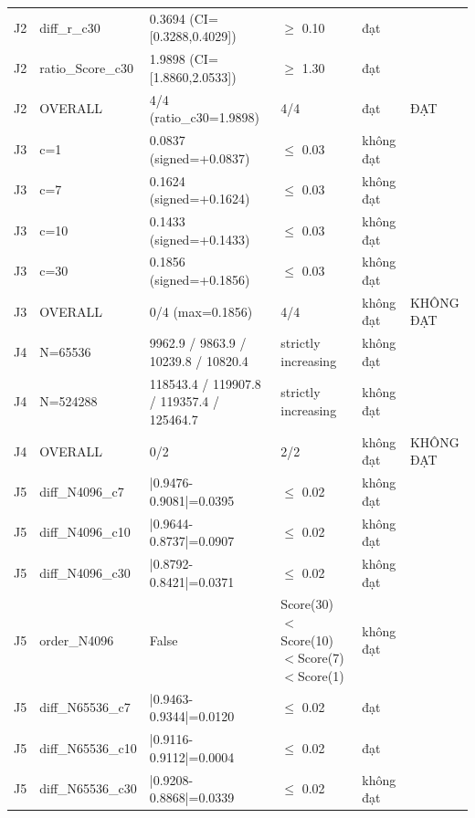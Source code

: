 \begin{longtable}{p{0.8cm}p{2.2cm}p{3.9cm}p{3.2cm}p{1.1cm}p{2.4cm}}
J2 & diff\_\allowbreak{}r\_\allowbreak{}c30 & 0.3694 (CI=\allowbreak{}[0.3288,\allowbreak{}0.4029]) & $\ge$\allowbreak{} 0.10 & đạt &  \\
J2 & ratio\_\allowbreak{}Score\_\allowbreak{}c30 & 1.9898 (CI=\allowbreak{}[1.8860,\allowbreak{}2.0533]) & $\ge$\allowbreak{} 1.30 & đạt &  \\
J2 & OVERALL & 4/4 (ratio\_\allowbreak{}c30=\allowbreak{}1.9898) & 4/4 & đạt & ĐẠT \\
J3 & c=\allowbreak{}1 & 0.0837 (signed=\allowbreak{}+0.0837) & $\le$\allowbreak{} 0.03 & không đạt &  \\
J3 & c=\allowbreak{}7 & 0.1624 (signed=\allowbreak{}+0.1624) & $\le$\allowbreak{} 0.03 & không đạt &  \\
J3 & c=\allowbreak{}10 & 0.1433 (signed=\allowbreak{}+0.1433) & $\le$\allowbreak{} 0.03 & không đạt &  \\
J3 & c=\allowbreak{}30 & 0.1856 (signed=\allowbreak{}+0.1856) & $\le$\allowbreak{} 0.03 & không đạt &  \\
J3 & OVERALL & 0/4 (max=\allowbreak{}0.1856) & 4/4 & không đạt & KHÔNG ĐẠT \\
J4 & N=\allowbreak{}65536 & 9962.9 / 9863.9 / 10239.8 / 10820.4 & strictly increasing & không đạt &  \\
J4 & N=\allowbreak{}524288 & 118543.4 / 119907.8 / 119357.4 / 125464.7 & strictly increasing & không đạt &  \\
J4 & OVERALL & 0/2 & 2/2 & không đạt & KHÔNG ĐẠT \\
J5 & diff\_\allowbreak{}N4096\_\allowbreak{}c7 & |0.9476-0.9081|=\allowbreak{}0.0395 & $\le$\allowbreak{} 0.02 & không đạt &  \\
J5 & diff\_\allowbreak{}N4096\_\allowbreak{}c10 & |0.9644-0.8737|=\allowbreak{}0.0907 & $\le$\allowbreak{} 0.02 & không đạt &  \\
J5 & diff\_\allowbreak{}N4096\_\allowbreak{}c30 & |0.8792-0.8421|=\allowbreak{}0.0371 & $\le$\allowbreak{} 0.02 & không đạt &  \\
J5 & order\_\allowbreak{}N4096 & False & Score(30)$<$\allowbreak{}Score(10)$<$\allowbreak{}Score(7)$<$\allowbreak{}Score(1) & không đạt &  \\
J5 & diff\_\allowbreak{}N65536\_\allowbreak{}c7 & |0.9463-0.9344|=\allowbreak{}0.0120 & $\le$\allowbreak{} 0.02 & đạt &  \\
J5 & diff\_\allowbreak{}N65536\_\allowbreak{}c10 & |0.9116-0.9112|=\allowbreak{}0.0004 & $\le$\allowbreak{} 0.02 & đạt &  \\
J5 & diff\_\allowbreak{}N65536\_\allowbreak{}c30 & |0.9208-0.8868|=\allowbreak{}0.0339 & $\le$\allowbreak{} 0.02 & không đạt &  \\

\end{longtable}
